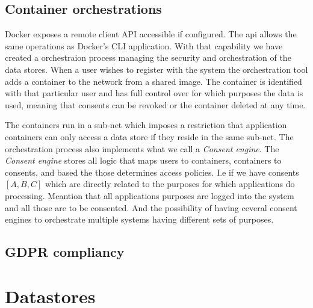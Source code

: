 \documentclass[USenglish]{uit-thesis}
\begin{document}
\subsection{Container orchestrations}
Docker exposes a remote client API accessible if configured.
The \gls{api} allows the same operations as Docker's CLI application.
With that capability we have created a orchestraion process managing the
security and orchestration of the data stores.
When a user wishes to register with the system the orchestration tool
adds a container to the network from a shared image.
The container is identified with that particular user and has full control over
for which purposes the data is used, meaning that consents can be revoked or the
container deleted at any time.

The containers run in a sub-net which imposes a restriction that application containers
can only access a data store if they reside in the same sub-net.
The orchestration process also implements what we call a \textit{Consent engine}.
The \textit{Consent engine} stores all logic that maps users to containers,
containers to consents, and based the those determines access policies.
I.e if we have consents $ [A, B, C] $ which are directly related to the purposes
for which applications do processing.
Meantion that all applications purposes are logged into the system and all those are
to be consented. And the possibility of having ceveral consent engines to orchestrate
multiple systems having different sets of purposes.

\subsection{GDPR compliancy}

\section{Datastores}



\end{document}
